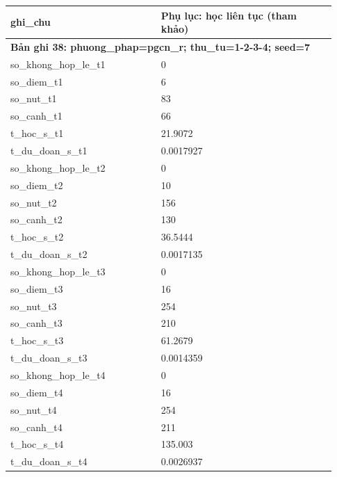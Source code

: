 \begin{longtable}{p{0.43\linewidth}p{0.50\linewidth}}
ghi\_\allowbreak chu & Phụ lục: học liên tục (tham khảo) \\
\midrule
\multicolumn{2}{p{0.95\linewidth}}{\textbf{Bản ghi 38: phuong\_phap=pgcn\_r; thu\_tu=1-2-3-4; seed=7}} \\
so\_\allowbreak khong\_\allowbreak hop\_\allowbreak le\_\allowbreak t1 & 0 \\
so\_\allowbreak diem\_\allowbreak t1 & 6 \\
so\_\allowbreak nut\_\allowbreak t1 & 83 \\
so\_\allowbreak canh\_\allowbreak t1 & 66 \\
t\_\allowbreak hoc\_\allowbreak s\_\allowbreak t1 & 21.9072 \\
t\_\allowbreak du\_\allowbreak doan\_\allowbreak s\_\allowbreak t1 & 0.0017927 \\
so\_\allowbreak khong\_\allowbreak hop\_\allowbreak le\_\allowbreak t2 & 0 \\
so\_\allowbreak diem\_\allowbreak t2 & 10 \\
so\_\allowbreak nut\_\allowbreak t2 & 156 \\
so\_\allowbreak canh\_\allowbreak t2 & 130 \\
t\_\allowbreak hoc\_\allowbreak s\_\allowbreak t2 & 36.5444 \\
t\_\allowbreak du\_\allowbreak doan\_\allowbreak s\_\allowbreak t2 & 0.0017135 \\
so\_\allowbreak khong\_\allowbreak hop\_\allowbreak le\_\allowbreak t3 & 0 \\
so\_\allowbreak diem\_\allowbreak t3 & 16 \\
so\_\allowbreak nut\_\allowbreak t3 & 254 \\
so\_\allowbreak canh\_\allowbreak t3 & 210 \\
t\_\allowbreak hoc\_\allowbreak s\_\allowbreak t3 & 61.2679 \\
t\_\allowbreak du\_\allowbreak doan\_\allowbreak s\_\allowbreak t3 & 0.0014359 \\
so\_\allowbreak khong\_\allowbreak hop\_\allowbreak le\_\allowbreak t4 & 0 \\
so\_\allowbreak diem\_\allowbreak t4 & 16 \\
so\_\allowbreak nut\_\allowbreak t4 & 254 \\
so\_\allowbreak canh\_\allowbreak t4 & 211 \\
t\_\allowbreak hoc\_\allowbreak s\_\allowbreak t4 & 135.003 \\
t\_\allowbreak du\_\allowbreak doan\_\allowbreak s\_\allowbreak t4 & 0.0026937 \\

\end{longtable}
